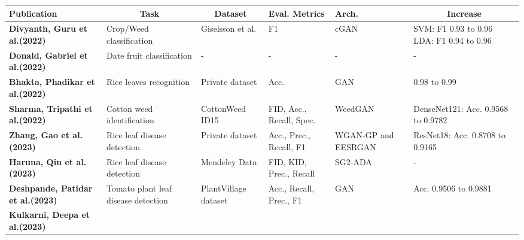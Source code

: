 \documentclass[preprint,12pt,authoryear]{elsarticle}
\begin{document}
{\small
\begin{longtable}{|p{2.1cm}|p{2cm}|p{2cm}|p{1.5cm}|p{1.5cm}|p{2cm}|}
\hline
\multicolumn{1}{|p{2.5cm}|}{\textbf{Publication}} &
  \multicolumn{1}{c|}{\textbf{Task}} &
  \multicolumn{1}{c|}{\textbf{Dataset}} &
  \multicolumn{1}{p{1.5cm}|}{\textbf{Eval. Metrics}} &
  \multicolumn{1}{p{1.8cm}|}{\textbf{Arch.}} &
  \multicolumn{1}{c|}{\textbf{Increase}} \\ \hline
\endfirsthead
%
\endhead
%
\textbf{Divyanth, Guru et al.(2022)}\cite{apl36} &
  Crop/Weed classification &
  Giselsson et al.\cite{apl47} &
  F1 &
  cGAN &
  SVM: F1 0.93 to 0.96 LDA: F1 0.94 to 0.96 \\ \hline
\textbf{Donald, Gabriel et al.(2022)}\cite{apl37} &
  Date fruit classification &
  - &
  - &
  - &
  - \\ \hline
\textbf{Bhakta, Phadikar et al.(2022)}\cite{apl38} &
  Rice leaves recognition &
  Private dataset &
  Acc. &
  GAN &
  0.98 to 0.99 \\ \hline
\textbf{Sharma, Tripathi et al.(2022)}\cite{apl39} &
  Cotton weed identification &
  CottonWeed ID15 &
  FID, Acc., Recall, Spec. &
  WeedGAN &
  DenseNet121: Acc. 0.9568 to 0.9782 \\ \hline
\textbf{Zhang, Gao et al.(2023)}\cite{apl40} &
  Rice leaf disease detection &
  Private dataset &
  Acc., Prec., Recall, F1 &
  WGAN-GP and EESRGAN &
  ResNet18: Acc. 0.8708 to 0.9165 \\ \hline
\textbf{Haruna, Qin et al.(2023)}\cite{apl46} &
  Rice leaf disease detection &
  Mendeley Data\cite{apl48} &
  FID, KID, Prec., Recall &
  SG2-ADA &
  - \\ \hline
\textbf{Deshpande, Patidar et al.(2023)}\cite{apl41} &
  Tomato plant leaf disease detection &
  PlantVillage dataset\cite{apl49} &
  Acc., Recall, Prec., F1 &
  GAN &
  Acc. 0.9506 to 0.9881 \\ \hline
\textbf{Kulkarni, Deepa et al.(2023)}\cite{apl42} &

\end{longtable}}
\end{document}
